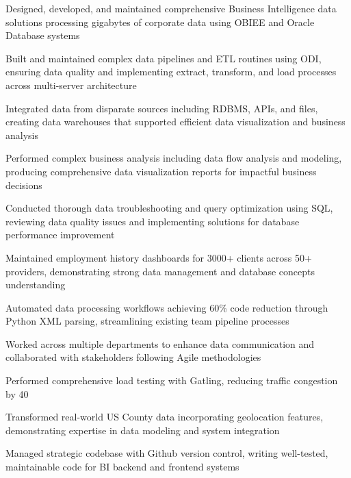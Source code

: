     \vspace{0.10 cm}
    \begin{onecolentry}
        \begin{highlights}
            \item Designed, developed, and maintained comprehensive Business Intelligence data solutions processing gigabytes of corporate data using OBIEE and Oracle Database systems
            \item Built and maintained complex data pipelines and ETL routines using ODI, ensuring data quality and implementing extract, transform, and load processes across multi-server architecture
            \item Integrated data from disparate sources including RDBMS, APIs, and files, creating data warehouses that supported efficient data visualization and business analysis
            \item Performed complex business analysis including data flow analysis and modeling, producing comprehensive data visualization reports for impactful business decisions
            \item Conducted thorough data troubleshooting and query optimization using SQL, reviewing data quality issues and implementing solutions for database performance improvement
            \item Maintained employment history dashboards for 3000+ clients across 50+ providers, demonstrating strong data management and database concepts understanding
            \item Automated data processing workflows achieving 60\% code reduction through Python XML parsing, streamlining existing team pipeline processes
            \item Worked across multiple departments to enhance data communication and collaborated with stakeholders following Agile methodologies
            \item Performed comprehensive load testing with Gatling, reducing traffic congestion by 40%
            \item Transformed real-world US County data incorporating geolocation features, demonstrating expertise in data modeling and system integration
            \item Managed strategic codebase with Github version control, writing well-tested, maintainable code for BI backend and frontend systems
        \end{highlights}
    \end{onecolentry}